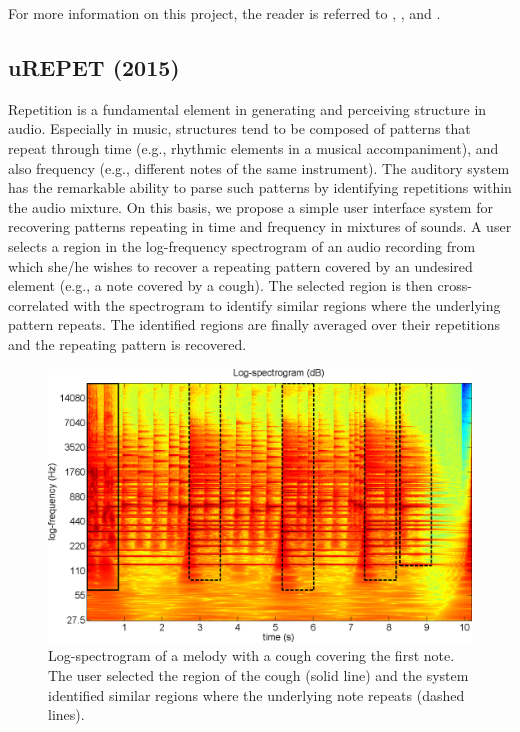 \documentclass{article}
\begin{document}
For more information on this project, the reader is referred to \cite{inproceedings_rafii_oct2012}, \cite{inproceedings_rafii_may2013}, and \cite{inbook_rafii_2014}.


\subsection{uREPET (2015)}
\label{ssec:urepet}

Repetition is a fundamental element in generating and perceiving structure in audio. Especially in music, structures tend to be composed of patterns that repeat through time (e.g., rhythmic elements in a musical accompaniment), and also frequency (e.g., different notes of the same instrument). The auditory system has the remarkable ability to parse such patterns by identifying repetitions within the audio mixture. On this basis, we propose a simple user interface system for recovering patterns repeating in time and frequency in mixtures of sounds. A user selects a region in the log-frequency spectrogram of an audio recording from which she/he wishes to recover a repeating pattern covered by an undesired element (e.g., a note covered by a cough). The selected region is then cross-correlated with the spectrogram to identify similar regions where the underlying pattern repeats. The identified regions are finally averaged over their repetitions and the repeating pattern is recovered.

\begin{figure}[!htb]
\centering
\includegraphics[width=\columnwidth]{Images/urepet_example1a.png}
\caption{Log-spectrogram of a melody with a cough covering the first note. The user selected the region of the cough (solid line) and the system identified similar regions where the underlying note repeats (dashed lines).}
\label{fig:urepet_example1a}
\end{figure}
\end{document}

